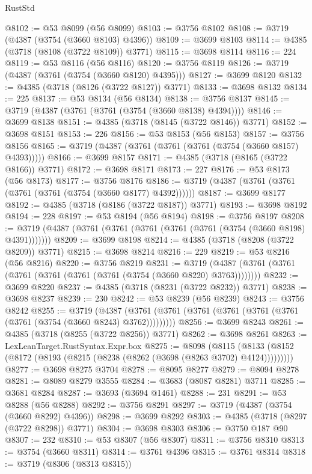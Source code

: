 \begin{lexlean}{RustStd}
\begin{coremodule}
{\begin{coremodule}
{{{{{{{{{{{{{{{{{{{{{{{{{{{{{{{{{{{{{{{{{{{{{{{@8102 := @53 @8099 (@56 @8099)
@8103 := @3756 @8102
@8108 := @3719 (@4387 (@3754 (@3660 @8103) @4396))
@8109 := @3699 @8103
@8114 := @4385 (@3718 (@8108 (@3722 @8109)) @3771)
@8115 := @3698 @8114
@8116 := 224
@8119 := @53 @8116 (@56 @8116)
@8120 := @3756 @8119
@8126 := @3719 (@4387 (@3761 (@3754 (@3660 @8120) @4395)))
@8127 := @3699 @8120
@8132 := @4385 (@3718 (@8126 (@3722 @8127)) @3771)
@8133 := @3698 @8132
@8134 := 225
@8137 := @53 @8134 (@56 @8134)
@8138 := @3756 @8137
@8145 := @3719 (@4387 (@3761 (@3761 (@3754 (@3660 @8138) @4394))))
@8146 := @3699 @8138
@8151 := @4385 (@3718 (@8145 (@3722 @8146)) @3771)
@8152 := @3698 @8151
@8153 := 226
@8156 := @53 @8153 (@56 @8153)
@8157 := @3756 @8156
@8165 := @3719 (@4387 (@3761 (@3761 (@3761 (@3754 (@3660 @8157) @4393)))))
@8166 := @3699 @8157
@8171 := @4385 (@3718 (@8165 (@3722 @8166)) @3771)
@8172 := @3698 @8171
@8173 := 227
@8176 := @53 @8173 (@56 @8173)
@8177 := @3756 @8176
@8186 := @3719 (@4387 (@3761 (@3761 (@3761 (@3761 (@3754 (@3660 @8177) @4392))))))
@8187 := @3699 @8177
@8192 := @4385 (@3718 (@8186 (@3722 @8187)) @3771)
@8193 := @3698 @8192
@8194 := 228
@8197 := @53 @8194 (@56 @8194)
@8198 := @3756 @8197
@8208 := @3719 (@4387 (@3761 (@3761 (@3761 (@3761 (@3761 (@3754 (@3660 @8198) @4391)))))))
@8209 := @3699 @8198
@8214 := @4385 (@3718 (@8208 (@3722 @8209)) @3771)
@8215 := @3698 @8214
@8216 := 229
@8219 := @53 @8216 (@56 @8216)
@8220 := @3756 @8219
@8231 := @3719 (@4387 (@3761 (@3761 (@3761 (@3761 (@3761 (@3761 (@3754 (@3660 @8220) @3763))))))))
@8232 := @3699 @8220
@8237 := @4385 (@3718 (@8231 (@3722 @8232)) @3771)
@8238 := @3698 @8237
@8239 := 230
@8242 := @53 @8239 (@56 @8239)
@8243 := @3756 @8242
@8255 := @3719
    (@4387 (@3761 (@3761 (@3761 (@3761 (@3761 (@3761 (@3761 (@3754 (@3660 @8243) @3762)))))))))
@8256 := @3699 @8243
@8261 := @4385 (@3718 (@8255 (@3722 @8256)) @3771)
@8262 := @3698 @8261
@8263 := LexLeanTarget.RustSyntax.Expr.box
@8275 := @8098
    (@8115 (@8133 (@8152 (@8172 (@8193 (@8215 (@8238 (@8262 (@3698 (@8263 @3702) @4124)))))))))
@8277 := @3698 @8275 @3704
@8278 := @8095 @8277
@8279 := @8094 @8278
@8281 := @8089 @8279 @3555
@8284 := @3683 (@8087 @8281) @3711
@8285 := @3681 @8284
@8287 := @3693 (@3694 @1461)
@8288 := 231
@8291 := @53 @8288 (@56 @8288)
@8292 := @3756 @8291
@8297 := @3719 (@4387 (@3754 (@3660 @8292) @4396))
@8298 := @3699 @8292
@8303 := @4385 (@3718 (@8297 (@3722 @8298)) @3771)
@8304 := @3698 @8303
@8306 := @3750 @187 @90
@8307 := 232
@8310 := @53 @8307 (@56 @8307)
@8311 := @3756 @8310
@8313 := @3754 (@3660 @8311)
@8314 := @3761 @4396
@8315 := @3761 @8314
@8318 := @3719 (@8306 (@8313 @8315))
}}}}}}}}}}}}}}}}}}}}}}}}}}}}}}}}}}}}}}}}}}}}}}}
\end{coremodule}}
\end{coremodule}
\end{lexlean}
